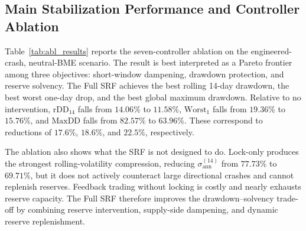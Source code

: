 \documentclass[a4paper,fleqn]{cas-dc}
\begin{document}
\subsection{Main Stabilization Performance and Controller Ablation}
\label{sec:exp-ablation}

Table~\ref{tab:abl_results} reports the seven-controller ablation on the engineered-crash, neutral-BME scenario. The result is best interpreted as a Pareto frontier among three objectives: short-window dampening, drawdown protection, and reserve solvency. The Full SRF achieves the best rolling 14-day drawdown, the best worst one-day drop, and the best global maximum drawdown. Relative to no intervention, \(\mathrm{rDD}_{14}\) falls from \(14.06\%\) to \(11.58\%\), \(\mathrm{Worst}_1\) falls from \(19.36\%\) to \(15.76\%\), and \(\mathrm{MaxDD}\) falls from \(82.57\%\) to \(63.96\%\). These correspond to reductions of \(17.6\%\), \(18.6\%\), and \(22.5\%\), respectively.

The ablation also shows what the SRF is not designed to do. Lock-only produces the strongest rolling-volatility compression, reducing \(\sigma_{\mathrm{ann}}^{(14)}\) from \(77.73\%\) to \(69.71\%\), but it does not actively counteract large directional crashes and cannot replenish reserves. Feedback trading without locking is costly and nearly exhausts reserve capacity. The Full SRF therefore improves the drawdown--solvency trade-off by combining reserve intervention, supply-side dampening, and dynamic reserve replenishment.
\end{document}
